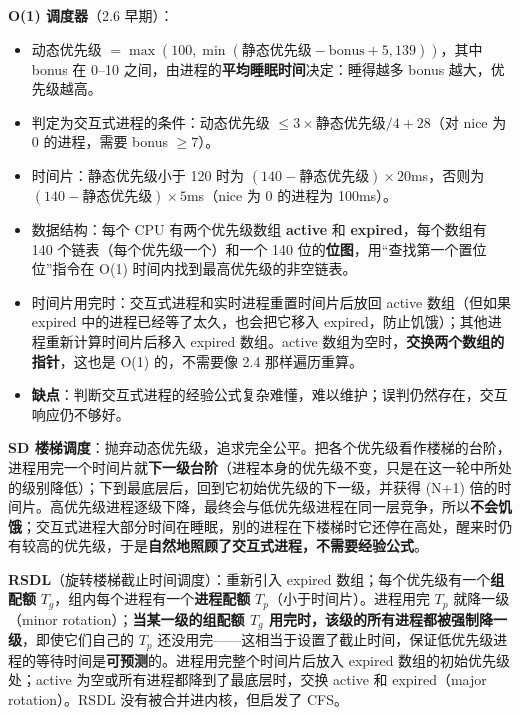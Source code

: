 \textbf{O(1) 调度器}（2.6 早期）：
\begin{itemize}
    \item 动态优先级 $= \max(100, \min(\text{静态优先级} - \text{bonus} + 5, 139))$，其中 bonus 在 0–10 之间，由进程的\textbf{平均睡眠时间}决定：睡得越多 bonus 越大，优先级越高。
    \item 判定为交互式进程的条件：动态优先级 $\le 3 \times \text{静态优先级}/4 + 28$（对 nice 为 0 的进程，需要 bonus $\ge 7$）。
    \item 时间片：静态优先级小于 120 时为 $(140 - \text{静态优先级}) \times 20$ms，否则为 $(140 - \text{静态优先级}) \times 5$ms（nice 为 0 的进程为 100ms）。
    \item 数据结构：每个 CPU 有两个优先级数组 \textbf{active} 和 \textbf{expired}，每个数组有 140 个链表（每个优先级一个）和一个 140 位的\textbf{位图}，用“查找第一个置位位”指令在 O(1) 时间内找到最高优先级的非空链表。
    \item 时间片用完时：交互式进程和实时进程重置时间片后放回 active 数组（但如果 expired 中的进程已经等了太久，也会把它移入 expired，防止饥饿）；其他进程重新计算时间片后移入 expired 数组。active 数组为空时，\textbf{交换两个数组的指针}，这也是 O(1) 的，不需要像 2.4 那样遍历重算。
    \item \textbf{缺点}：判断交互式进程的经验公式复杂难懂，难以维护；误判仍然存在，交互响应仍不够好。
\end{itemize}

\textbf{SD 楼梯调度}：抛弃动态优先级，追求完全公平。把各个优先级看作楼梯的台阶，进程用完一个时间片就\textbf{下一级台阶}（进程本身的优先级不变，只是在这一轮中所处的级别降低）；下到最底层后，回到它初始优先级的下一级，并获得 (N+1) 倍的时间片。高优先级进程逐级下降，最终会与低优先级进程在同一层竞争，所以\textbf{不会饥饿}；交互式进程大部分时间在睡眠，别的进程在下楼梯时它还停在高处，醒来时仍有较高的优先级，于是\textbf{自然地照顾了交互式进程，不需要经验公式}。

\textbf{RSDL}（旋转楼梯截止时间调度）：重新引入 expired 数组；每个优先级有一个\textbf{组配额} $T_g$，组内每个进程有一个\textbf{进程配额} $T_p$（小于时间片）。进程用完 $T_p$ 就降一级（minor rotation）；\textbf{当某一级的组配额 $T_g$ 用完时，该级的所有进程都被强制降一级}，即使它们自己的 $T_p$ 还没用完——这相当于设置了截止时间，保证低优先级进程的等待时间是\textbf{可预测}的。进程用完整个时间片后放入 expired 数组的初始优先级处；active 为空或所有进程都降到了最底层时，交换 active 和 expired（major rotation）。RSDL 没有被合并进内核，但启发了 CFS。

